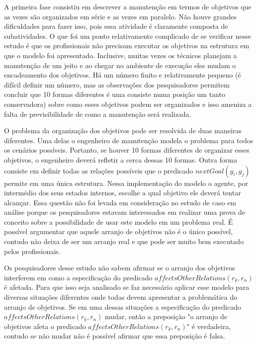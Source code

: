 A primeira fase consistiu em descrever a manutenção em termos de objetivos que as vezes são organizados em série e as vezes em paralelo. Não houve grandes dificuldades para fazer isso, 
pois essa atividade é claramente composta de subatividades. O que foi um ponto relativamente complicado de se verificar nesse estudo é que os profissionais não precisam executar os objetivos na 
estrutura em que o modelo foi apresentado. Inclusive, muitas vezes os técnicos planejam a manutenção de um jeito e ao chegar no ambiente de execução eles mudam o encadeamento dos objetivos. 
Há um número finito e relativamente pequeno (é difícil definir um número, mas as observações dos pesquisadores permitem concluir que 10 formas diferentes é uma consiste numa posição um tanto 
conservadora) sobre como esses objetivos podem ser organizados e isso ameniza a falta de previsibilidade de como a manutenção será realizada. 

O problema da organização dos objetivos pode ser resolvida de duas maneiras diferentes. Uma delas o engenheiro de manutenção modela o problema para todos os cenários possíveis. Portanto, 
se houver 10 formas diferentes de organizar esses objetivos, o engenheiro deverá refletir a cerca dessas 10 formas. Outra forma consiste em definir todas as relações possíveis que o predicado 
$nextGoal(g_i,g_j)$ permite em uma única estrutura. Nessa implementação do modelo o agente, por intermédio dos seus estados internos, escolhe a qual objetivo ele deverá tentar alcançar. Essa 
questão não foi levada em consideração no estudo de caso em análise porque os pesquisadores estavam interessados em realizar uma prova de conceito sobre a possibilidade de usar este modelo 
em um problema real. É possível argumentar que aquele arranjo de objetivos não é o único possível, contudo não deixa de ser um arranjo real e que pode ser muito bem executado pelos profissionais. 

Os pesquisadores desse estudo não sabem afirmar se o arranjo dos objetivos interferem em como a especificação do predicado $affectsOtherRelations(r_k,r_n)$ é afetada. Para que isso seja 
analisado se faz necessário aplicar esse modelo para diversas situações diferentes onde todas devem apresentar a problemática do arranjo de objetivos. Se em uma dessas situações a especificação 
do predicado $affectsOtherRelations(r_k,r_n)$ mudar, então a preposição "o arranjo de objetivos afeta o predicado $affectsOtherRelations(r_k,r_n)$" é verdadeira, contudo se não mudar não é 
possível afirmar que essa preposição é falsa. 

